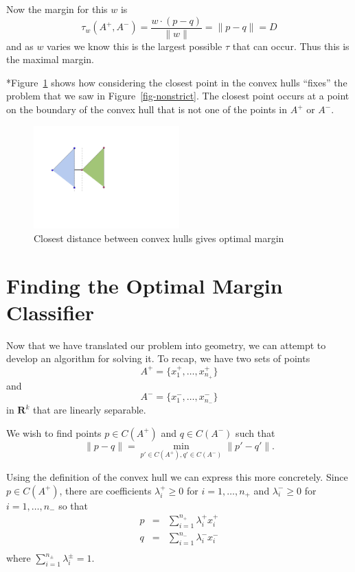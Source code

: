 \documentclass[
  11pt,
  letterpaper,
]{scrbook}
\theoremstyle{plain}
\theoremstyle{plain}
\theoremstyle{remark}
\begin{document}
Now the margin for this \(w\) is \[
\tau_{w}(A^{+},A^{-}) = \frac{w\cdot (p-q)}{\|w\|} = \|p-q\|=D
\] and as \(w\) varies we know this is the largest possible \(\tau\)
that can occur. Thus this is the maximal margin.

*Figure~\ref{fig-strict} shows how considering the closest point in the
convex hulls ``fixes'' the problem that we saw in
Figure~\ref{fig-nonstrict}. The closest point occurs at a point on the
boundary of the convex hull that is not one of the points in \(A^{+}\)
or \(A^{-}\).

\begin{figure}

{\centering \includegraphics[width=0.5\textwidth,height=\textheight]{chapters/img/ConvexHullWithMargin.png}

}

\caption{\label{fig-strict}Closest distance between convex hulls gives
optimal margin}

\end{figure}

\hypertarget{finding-the-optimal-margin-classifier}{%
\section{Finding the Optimal Margin
Classifier}\label{finding-the-optimal-margin-classifier}}

Now that we have translated our problem into geometry, we can attempt to
develop an algorithm for solving it. To recap, we have two sets of
points \[
A^{+}=\{x^+_1,\ldots, x^+_{n_{+}}\}
\] and \[
A^{-}=\{x^-_1,\ldots, x^-_{n_{-}}\}
\] in \(\mathbf{R}^{k}\) that are linearly separable.

We wish to find points \(p\in C(A^{+})\) and \(q\in C(A^{-})\) such that
\[
\|p-q\|=\min_{p'\in C(A^{+}),q'\in C(A^{-})} \|p'-q'\|.
\]

Using the definition of the convex hull we can express this more
concretely. Since \(p\in C(A^{+})\), there are coefficients
\(\lambda^{+}_{i}\ge 0\) for \(i=1,\ldots,n_{+}\) and
\(\lambda^{-}_{i}\ge 0\) for \(i=1,\ldots, n_{-}\) so that \[
\begin{aligned}
p&=&\sum_{i=1}^{n_{+}}\lambda^{+}_{i} x^{+}_{i} \\
q&=&\sum_{i=1}^{n_{-}}\lambda^{-}_{i} x^{-}_{i} \\
\end{aligned}
\] where \(\sum_{i=1}^{n_{\pm}} \lambda_{i}^{\pm}=1\).
\end{document}
